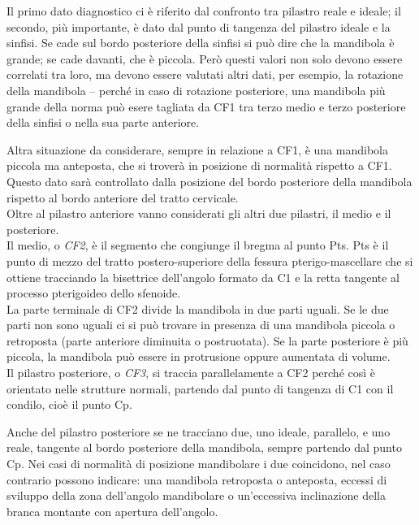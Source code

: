 Il primo dato diagnostico ci è riferito dal confronto tra pilastro reale e ideale; il secondo, più importante, è dato dal punto di tangenza del pilastro ideale e la sinfisi. Se cade sul bordo posteriore della sinfisi si può dire che la mandibola è grande; se cade davanti, che è piccola. Però questi valori non solo devono essere correlati tra loro, ma devono essere valutati altri dati, per esempio, la rotazione della mandibola -- perché in caso di rotazione posteriore, una mandibola più grande della norma può esere tagliata da CF1 tra terzo medio e terzo posteriore della sinfisi o nella sua parte anteriore.

Altra situazione da considerare, sempre in relazione a CF1, è una mandibola piccola ma anteposta, che si troverà in posizione di normalità rispetto a CF1. Questo dato sarà controllato dalla posizione del bordo posteriore della mandibola rispetto al bordo anteriore del tratto cervicale.\\

Oltre al pilastro anteriore vanno considerati gli altri due pilastri, il medio e il posteriore.\\

Il medio, o \emph{CF2}, è il segmento che congiunge il bregma al punto Pts. Pts è il punto di mezzo del tratto postero-superiore della fessura pterigo-mascellare che si ottiene tracciando la bisettrice dell'angolo formato da C1 e la retta tangente al processo pterigoideo dello sfenoide.\\
La parte terminale di CF2 divide la mandibola in due parti uguali. Se le due parti non sono uguali ci si può trovare in presenza di una mandibola piccola o retroposta (parte anteriore diminuita o postruotata). Se la parte posteriore è più piccola, la mandibola può essere in protrusione oppure aumentata di volume.\\

Il pilastro posteriore, o \emph{CF3}, si traccia parallelamente a CF2 perché così è orientato nelle strutture normali, partendo dal punto di tangenza di C1 con il condilo, cioè il punto Cp.

Anche del pilastro posteriore se ne tracciano due, uno ideale, parallelo, e uno reale, tangente al bordo posteriore della mandibola, sempre partendo dal punto Cp. Nei casi di normalità di posizione mandibolare i due coincidono, nel caso contrario possono indicare: una mandibola retroposta o anteposta, eccessi di sviluppo della zona dell'angolo mandibolare o un'eccessiva inclinazione della branca montante con apertura dell'angolo.\\


